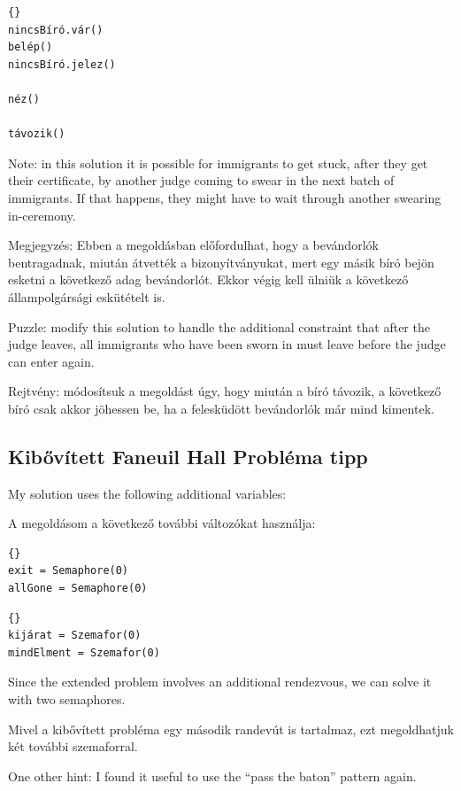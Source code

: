 \documentclass{book}
\newcommand{\clearemptydoublepage}{\newpage\cleardoublepage}
\begin{document}
\begin{lstlisting}[title={Faneuil Hall probléma megoldás (néző)}]{}
nincsBíró.vár()
belép()
nincsBíró.jelez()

néz()

távozik()
\end{lstlisting}

Note: in this solution it is possible for immigrants to get stuck,
after they get their certificate, by another judge coming to swear
in the next batch of immigrants.  If that happens, they might have
to wait through another swearing in-ceremony.

Megjegyzés: Ebben a megoldásban előfordulhat, hogy a bevándorlók
bentragadnak, miután átvették a bizonyítványukat, mert egy
másik bíró bejön esketni a következő adag bevándorlót. Ekkor
végig kell ülniük a következő állampolgársági eskütételt is.

Puzzle: modify this solution to handle the additional constraint
that after the judge leaves, all immigrants who have been sworn
in must leave before the judge can enter again.

Rejtvény: módosítsuk a megoldást úgy, hogy miután a bíró távozik,
a következő bíró csak akkor jöhessen be, ha a felesküdött bevándorlók
már mind kimentek.


\clearemptydoublepage
\subsection{Kibővített Faneuil Hall Probléma tipp}

My solution uses the following additional variables:

A megoldásom a következő további változókat használja:

\begin{lstlisting}[title={Faneuil Hall problem hint}]{}
exit = Semaphore(0)
allGone = Semaphore(0)
\end{lstlisting}

\begin{lstlisting}[title={Kibővített Faneuil Hall Probléma tipp}]{}
kijárat = Szemafor(0)
mindElment = Szemafor(0)
\end{lstlisting}

Since the extended problem involves an additional rendezvous,
we can solve it with two semaphores.

Mivel a kibővített probléma egy második randevút is
tartalmaz, ezt megoldhatjuk két további szemaforral.

One other hint: I found it useful to use the ``pass the baton''
pattern again.
\end{document}
